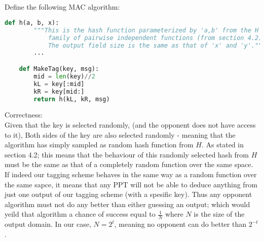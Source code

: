 \subsection{}
Define the following MAC algorithm:
\begin{lstlisting}[language=Python]
	def h(a, b, x):
		"""This is the hash function parameterized by 'a,b' from the H
			family of pairwise independent functions (from section 4.2).
			The output field size is the same as that of 'x' and 'y'."""
		...

	def MakeTag(key, msg):
		mid = len(key)//2
		kL = key[:mid]
		kR = key[mid:]
		return h(kL, kR, msg)
\end{lstlisting}

Correctness:\\
Given that the key is selected randomly, (and the opponent does not have access to it),
Both sides of the key are also selected randomly - meaning that the algorithm 
has simply sampled as random hash function from $H$. As stated in section 4.2;
this means that the behaviour of this randomly selected hash from $H$ must be
the same as that of a completely random function over the same space. If indeed 
our tagging scheme behaves in the same way as a random function over the same sapce,
it means that any PPT will not be able to deduce anything from just one output 
of our tagging scheme (with a spesific key). Thus any opponent algorithm
must not do any better than either guessing an output; which would yeild that
algorithm a chance of success equal to $\frac{1}{N}$ where $N$ is the size of the
output domain. In our case, $N=2^t$, meaning no opponent can do better than $2^{-t}$.
